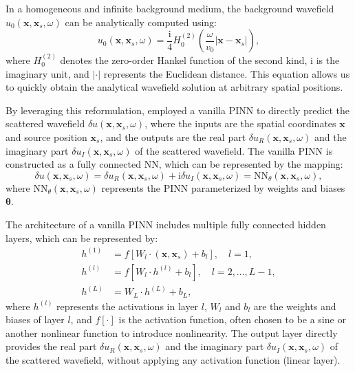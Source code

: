 In a homogeneous and infinite background medium, the background wavefield $u_0(\mathbf{x}, \mathbf{x}_s,\omega)$ can be analytically computed using:
\begin{equation}\label{eq3} 
u_0(\mathbf{x},\mathbf{x}_s,\omega) = \frac{\mathrm{i}}{4} H_0^{(2)}\left( \frac{\omega}{v_0} \left| \mathbf{x} - \mathbf{x}_s \right| \right), 
\end{equation}
where $H_0^{(2)}$ denotes the zero-order Hankel function of the second kind, $\mathrm{i}$ is the imaginary unit, and $\left| \cdot \right|$ represents the Euclidean distance. This equation allows us to quickly obtain the analytical wavefield solution at arbitrary spatial positions. 

By leveraging this reformulation, \cite{song2021solving} employed a vanilla PINN to directly predict the scattered wavefield $\delta u(\mathbf{x},\mathbf{x}_s,\omega)$, where the inputs are the spatial coordinates $\mathbf{x}$ and source position $\mathbf{x}_s$, and the outputs are the real part $\delta u_R(\mathbf{x},\mathbf{x}_s,\omega)$ and the imaginary part $\delta u_I(\mathbf{x},\mathbf{x}_s,\omega)$ of the scattered wavefield. The vanilla PINN is constructed as a fully connected NN, which can be represented by the mapping:
\begin{equation}\label{eq4} 
\delta u(\mathbf{x},\mathbf{x}_s,\omega) = \delta u_R(\mathbf{x},\mathbf{x}_s,\omega) + \mathrm{i} \delta u_I(\mathbf{x},\mathbf{x}_s,\omega) = \text{NN}_\theta(\mathbf{x},\mathbf{x}_s,\omega), 
\end{equation}
where $\text{NN}_\theta(\mathbf{x},\mathbf{x}_s,\omega)$ represents the PINN parameterized by weights and biases $\boldsymbol{\theta}$.  

The architecture of a vanilla PINN includes multiple fully connected hidden layers, which can be represented by:
\begin{equation}\label{eq5} 
\begin{aligned} 
h^{(1)} &= f[W_l \cdot (\mathbf{x}, \mathbf{x}_s) + b_l], \quad l = 1, \\
h^{(l)} &= f[W_l \cdot h^{(l)} + b_l], \quad l = 2, \ldots, L-1, \\
h^{(L)} &= W_L \cdot h^{(L)} + b_L, 
\end{aligned} 
\end{equation}
where $h^{(l)}$ represents the activations in layer $l$, $W_l$ and $b_l$ are the weights and biases of layer $l$, and $f[\cdot]$ is the activation function, often chosen to be a sine or another nonlinear function to introduce nonlinearity. The output layer directly provides the real part $\delta u_R(\mathbf{x},\mathbf{x}_s,\omega)$ and the imaginary part $\delta u_I(\mathbf{x},\mathbf{x}_s,\omega)$ of the scattered wavefield, without applying any activation function (linear layer). 

